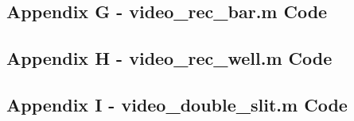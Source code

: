 \documentclass[10pt]{article}
\begin{document}
\subsection*{Appendix G - video\_rec\_bar.m Code}

\pagebreak

\subsection*{Appendix H - video\_rec\_well.m Code}

\pagebreak

\subsection*{Appendix I - video\_double\_slit.m Code}

\pagebreak
\end{document}
